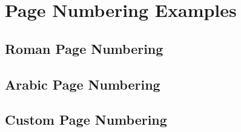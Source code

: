 \documentclass{article}
\begin{document}
\section{Page Numbering Examples}

\subsection{Roman Page Numbering}
\setcounter{page}{1} %
\lipsum[1-5] %

\newpage

\subsection{Arabic Page Numbering}
\setcounter{page}{1} %
\lipsum[6-10] %

\newpage

\subsection{Custom Page Numbering}
\renewcommand{\thepage}{A-\arabic{page}} %
\setcounter{page}{1} %
\lipsum[11-15] %
\end{document}
